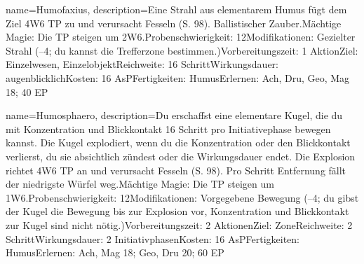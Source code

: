 {
    name={Humofaxius},
    description={Eine Strahl aus elementarem Humus fügt dem Ziel 4W6 TP zu und verursacht Fesseln (S. 98). Ballistischer Zauber.\newline Mächtige Magie: Die TP steigen um 2W6.\newline Probenschwierigkeit: 12\newline Modifikationen: Gezielter Strahl (–4; du kannst die Trefferzone bestimmen.)\newline Vorbereitungszeit: 1 Aktion\newline Ziel: Einzelwesen, Einzelobjekt\newline Reichweite: 16 Schritt\newline Wirkungsdauer: augenblicklich\newline Kosten: 16 AsP\newline Fertigkeiten: Humus\newline Erlernen: Ach, Dru, Geo, Mag 18; 40 EP}
}


{
    name={Humosphaero},
    description={Du erschaffst eine elementare Kugel, die du mit Konzentration und Blickkontakt 16 Schritt pro Initiativephase bewegen kannst. Die Kugel explodiert, wenn du die Konzentration oder den Blickkontakt verlierst, du sie absichtlich zündest oder die Wirkungsdauer endet. Die Explosion richtet 4W6 TP an und verursacht Fesseln (S. 98). Pro Schritt Entfernung fällt der niedrigste Würfel weg.\newline Mächtige Magie: Die TP steigen um 1W6.\newline Probenschwierigkeit: 12\newline Modifikationen: Vorgegebene Bewegung (–4; du gibst der Kugel die Bewegung bis zur Explosion vor, Konzentration und Blickkontakt zur Kugel sind nicht nötig.)\newline Vorbereitungszeit: 2 Aktionen\newline Ziel: Zone\newline Reichweite: 2 Schritt\newline Wirkungsdauer: 2 Initiativphasen\newline Kosten: 16 AsP\newline Fertigkeiten: Humus\newline Erlernen: Ach, Mag 18; Geo, Dru 20; 60 EP}
}


